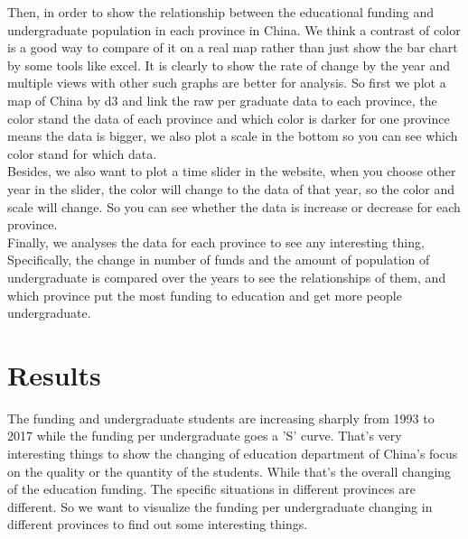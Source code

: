 \noindent Then, in order to show the relationship between the educational funding and undergraduate population in each province in China. \cite{graves2013visualization}We think a contrast of color is a good way to compare of it on a real map rather than just show the bar chart by some tools like excel. \cite{bao2014visual}It is clearly to show the rate of change by the year and multiple views with other such graphs are better for analysis. So first we plot a map of China by d3 and link the raw per graduate data to each province, the color stand the data of each province and which color is darker for one province means the data is bigger, we also plot a scale in the bottom so you can see which color stand for which data.\cite{harper2014deconstructing} \\

\noindent Besides, we also want to plot a time slider in the website\cite{wang2008importance}, when you choose other year in the slider, the color will change to the data of that year\cite{healey1996choosing}, so the color and scale will change. \cite{zastrow2015data}So you can see whether the data is increase or decrease for each province.\\

\noindent Finally, we analyses the data for each province to see any interesting thing, Specifically, the change in number of funds and the amount of population of undergraduate is compared over the years to see the relationships of them,\cite{tsang1996financia} and which province put the most funding to education and get more people undergraduate.

\timeline

\section{Results}
\label{sec:results}

\map

The funding and undergraduate students are increasing sharply from 1993 to 2017 while the funding per undergraduate goes a 'S' curve. That's very interesting things to show the changing of education department of China's focus on the quality or the quantity of the students. While that's the overall changing of the education funding. The specific situations in different provinces are different. So we want to visualize the funding per undergraduate changing in different provinces to find out some interesting things.\\

